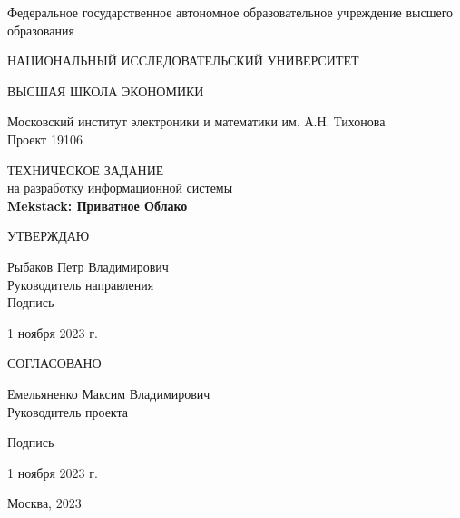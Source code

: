 \documentclass[14pt, a4paper]{extarticle}
\date{\today}
\begin{document}

\begin{titlepage}
    \begin{center}
        Федеральное государственное автономное образовательное учреждение высшего
        образования\par
        НАЦИОНАЛЬНЫЙ ИССЛЕДОВАТЕЛЬСКИЙ УНИВЕРСИТЕТ\par ВЫСШАЯ ШКОЛА ЭКОНОМИКИ\par
        \vspace{1cm}
        Московский институт электроники и математики им. А.Н. Тихонова \\
        \vspace{1cm}
        Проект 19106 \\
        \vspace{2cm}
    \end{center}

    \begin{center}
        ТЕХНИЧЕСКОЕ ЗАДАНИЕ \\
        на разработку информационной системы \\
        \textbf{Mekstack: Приватное Облако} \\
    \end{center}
    \vfill

    \begin{minipage}[t]{0.5\textwidth}
        \begin{center}
        УТВЕРЖДАЮ
        \end{center}
        \begin{flushleft}
        Рыбаков Петр Владимирович\\
        Руководитель направления\\

        \vspace{0.5cm}
        Подпись
        \vspace{0.5cm}

        1 ноября 2023 г.
        \end{flushleft}
    \end{minipage}%

    \vspace{2cm}

    \begin{minipage}[t]{0.5\textwidth}
        \begin{center}
        СОГЛАСОВАНО
        \end{center}
        \begin{flushleft}
        Емельяненко Максим Владимирович\\
        Руководитель проекта

        \vspace{0.5cm}
        Подпись
        \vspace{0.5cm}

        1 ноября 2023 г.
        \end{flushleft}
    \end{minipage}%

    \vspace{2cm}
    \center
    Москва, 2023
\end{titlepage}
\end{document}
